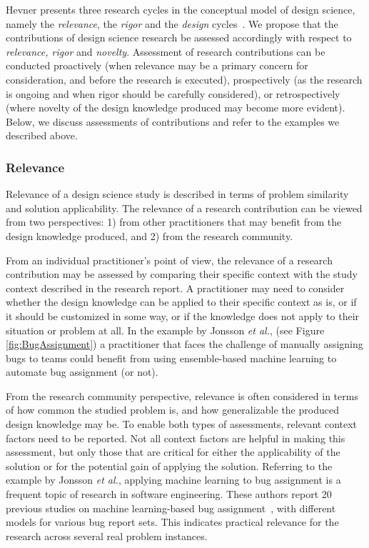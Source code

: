 \documentclass[graybox]{svmult}
\begin{document}
Hevner presents three research cycles in the conceptual model of design science, namely the \emph{relevance}, the \emph{rigor} and the \emph{design} cycles~\cite{Hevner2007}. We propose that the contributions of design science research be assessed accordingly with respect to \emph{relevance, rigor} and \emph{novelty}. 
Assessment of research contributions can be conducted proactively (when relevance may be a primary concern for consideration, and before the research is executed), prospectively (as the research is ongoing and when rigor should be carefully considered), or retrospectively (where novelty of the design knowledge produced may become more evident).
Below, we discuss assessments of contributions and refer to the examples we described above.




\subsubsection{Relevance} 

Relevance of a design science study is described in terms of problem similarity and solution applicability. The relevance of a research contribution can be viewed from two perspectives: 1) from other practitioners that may benefit from the design knowledge produced, and 2) from the research community. 

From an individual practitioner's point of view, the relevance of a research contribution may be assessed by comparing their specific context with the study context described in the research report. 
A practitioner may need to consider whether the design knowledge can be applied to their specific context as is, or if it should be customized in some way, or if the knowledge does not apply to their situation or problem at all.
In the example by Jonsson \emph{et al.}, (see Figure \ref{fig:BugAssignment}) a practitioner that faces the challenge of manually assigning bugs to teams could benefit from using ensemble-based machine learning to automate bug assignment (or not).

From the research community perspective, relevance is often considered in terms of how common the studied problem is, and how generalizable the produced design knowledge may be. To enable both types of assessments, relevant context factors need to be reported. Not all context factors are helpful in making this assessment, but only those that are critical for either the applicability of the solution or for the potential gain of applying the solution. 
Referring to the example by Jonsson \emph{et al.}, applying machine learning to bug assignment is a frequent topic of research in software engineering. These authors report 20 previous studies on machine learning-based bug assignment~\cite[Fig.2]{JonssonBug15}, with different models for various bug report sets. This indicates practical relevance for the research across several real problem instances. 
\end{document}
